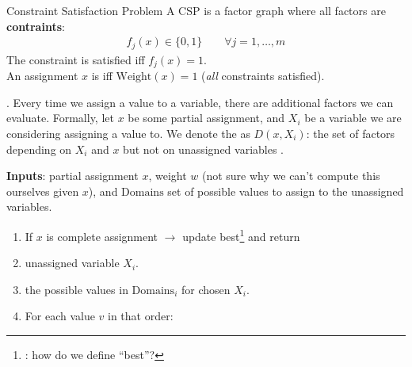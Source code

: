 \documentclass[11pt]{article}
\newcommand\myspace[1][]{\vspace{#1\bigskipamount}\Needspace{10\baselineskip}}
\newcommand\p{\Needspace{10\baselineskip} \noindent}
\newcommand\bluesec[1]{\myspace \p \blue{#1}}
\begin{document}
\begin{definition}{Constraint Satisfaction Problem }
    A CSP is a factor graph where all factors are \textbf{contraints}:
    \begin{align}
        f_j(x) \in \{0, 1\} \qquad \forall j = 1, \ldots, m
    \end{align}
    The constraint is satisfied iff $f_j(x) = 1$.\\

    An assignment $x$ is  iff $\text{Weight}(x) = 1$ (\textit{all} constraints satisfied).
\end{definition}

\bluesec{Dynamic Ordering} . Every time we assign a value to a variable, there are additional factors we can evaluate. Formally, let $x$ be some partial assignment, and $X_i$ be a variable we are considering assigning a value to. We denote the  as $D(x, X_i)$: the set of factors depending on $X_i$ and $x$ but not on unassigned variables . 

\begin{algorithm}
	\textbf{Inputs}: partial assignment $x$, weight $w$ (not sure why we can't compute this ourselves given $x$), and $\text{Domains}$ set of possible values to assign to the unassigned variables.
	
	\begin{enumerate}
		\item If $x$ is complete assignment $\longrightarrow$ update best\footnote{: how do we define ``best''?} and return
		
		\item {} unassigned variable $X_i$. 
		
		\item {} the possible values in $\text{Domains}_i$ for chosen $X_i$. 
		
		\item For each value $v$ in that order:
	\end{enumerate}
	
\end{algorithm}
\end{document}
